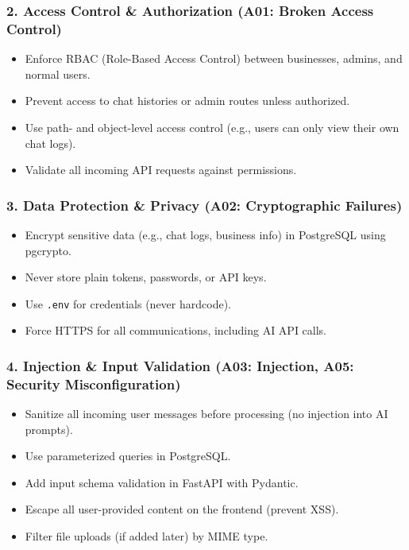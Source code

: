 \documentclass[12pt,a4paper]{article}
\begin{document}
\subsubsection{2. Access Control \& Authorization (A01: Broken Access Control)}
\begin{itemize}
    \item Enforce RBAC (Role-Based Access Control) between businesses, admins, and normal users.
    \item Prevent access to chat histories or admin routes unless authorized.
    \item Use path- and object-level access control (e.g., users can only view their own chat logs).
    \item Validate all incoming API requests against permissions.
\end{itemize}

\subsubsection{3. Data Protection \& Privacy (A02: Cryptographic Failures)}
\begin{itemize}
    \item Encrypt sensitive data (e.g., chat logs, business info) in PostgreSQL using pgcrypto.
    \item Never store plain tokens, passwords, or API keys.
    \item Use \texttt{.env} for credentials (never hardcode).
    \item Force HTTPS for all communications, including AI API calls.
\end{itemize}

\subsubsection{4. Injection \& Input Validation (A03: Injection, A05: Security Misconfiguration)}
\begin{itemize}
    \item Sanitize all incoming user messages before processing (no injection into AI prompts).
    \item Use parameterized queries in PostgreSQL.
    \item Add input schema validation in FastAPI with Pydantic.
    \item Escape all user-provided content on the frontend (prevent XSS).
    \item Filter file uploads (if added later) by MIME type.
\end{itemize}
\end{document}
